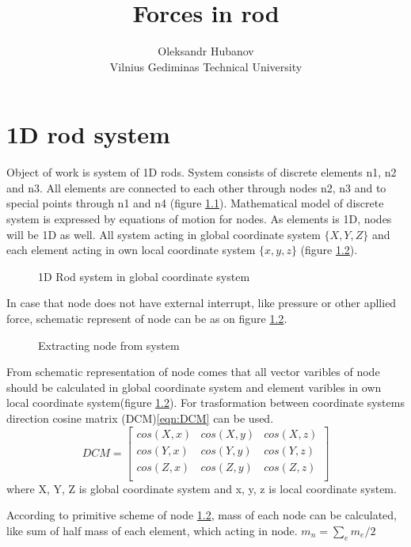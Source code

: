\documentclass[12pt]{report}
\begin{document}
\title{Forces in rod}
\author{Oleksandr Hubanov\\
Vilnius Gediminas Technical University}
\maketitle
\pagebreak
\chapter {1D rod system}\par Object of work is system of 1D rods. System
consists of discrete elements n1, n2 and n3. All elements are connected to each
other through nodes n2, n3 and to special points through n1 and n4 (figure
\ref{fig:rodSystem}). Mathematical model of discrete system is expressed by
equations of motion for nodes. As elements is 1D, nodes will be 1D as well. All
system acting in global coordinate system $\{X, Y, Z\}$ and each element acting
in own local coordinate system $\{x,y,z\}$ (figure \ref{fig:nodeExtract}).\par
\begin{figure}[ht]
  \centering
      
  \caption{1D Rod system in global coordinate system}\label{fig:rodSystem}      
\end{figure}
In case that node does not have external interrupt, like pressure or other
apllied force, schematic represent of node can be as on figure
\ref{fig:nodeExtract}.\par
\begin{figure}[ht]
  \centering
      
  \caption{Extracting node from system}\label{fig:nodeExtract}
\end{figure}
From schematic representation of node comes that all vector varibles of node
should be calculated in global coordinate system and element varibles in own
local coordinate system(figure \ref{fig:nodeExtract}). For trasformation between
coordinate systems direction cosine matrix (DCM)\eqref{eqn:DCM} can be used.
\begin{equation}\label{eqn:DCM}
  DCM= \begin{bmatrix}
    cos(X,x)&cos(X,y)&cos(X,z)\\
    cos(Y,x)&cos(Y,y)&cos(Y,z)\\
    cos(Z,x)&cos(Z,y)&cos(Z,z)\\
   \end{bmatrix} 
\end{equation}
where {X, Y, Z} is global coordinate system and {x, y, z} is local coordinate
system.\par According to primitive scheme of node \ref{fig:nodeExtract}, mass of
each node can be calculated, like sum of half mass of each element, which acting
in node. $m_n=\sum_{e}m_e/2$\par
\end{document}
